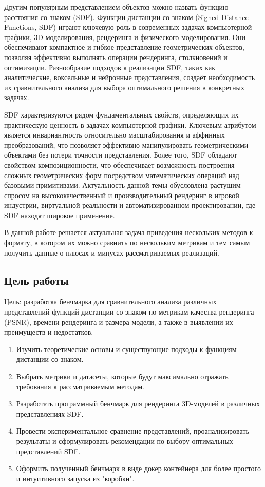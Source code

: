 \documentclass[a4paper,hidelinks,12pt]{article}
\begin{document}
\par
Другим популярным представлением объектов можно назвать функцию расстояния со знаком (SDF). Функции дистанции со знаком 
(Signed Distance Functions, SDF) играют ключевую роль в современных задачах компьютерной графики, 3D-моделирования, рендеринга и 
физического моделирования. Они обеспечивают компактное и гибкое представление геометрических объектов, позволяя эффективно выполнять 
операции рендеринга, столкновений и оптимизации. Разнообразие подходов к реализации SDF, таких как аналитические, воксельные и 
нейронные представления, создаёт необходимость их сравнительного анализа для выбора оптимального решения в конкретных задачах. 
\par
SDF характеризуются рядом фундаментальных свойств, определяющих их практическую ценность в задачах компьютерной графики. 
Ключевым атрибутом является инвариантность относительно масштабирования и аффинных преобразований, что позволяет эффективно 
манипулировать геометрическими объектами без потери точности представления. Более того, SDF обладают свойством композиционности, 
что обеспечивает возможность построения сложных геометрических форм посредством математических операций над базовыми примитивами. Актуальность данной темы обусловлена растущим спросом на высококачественный и производительный рендеринг в игровой индустрии, 
виртуальной реальности и автоматизированном проектировании, где SDF находят широкое применение. 
\par 
В данной работе решается актуальная задача приведения нескольких методов к формату, в котором их можно сравнить по нескольким метрикам и тем самым получить
данные о плюсах и минусах рассматриваемых реализаций.

\newpage
\subsection{Цель работы}
Цель: разработка бенчмарка для сравнительного анализа различных представлений функций дистанции со 
знаком по метрикам качества рендеринга (PSNR), времени рендеринга и размера модели, а также в выявлении их преимуществ и недостатков.

\begin{enumerate}
	\item Изучить теоретические основы и существующие подходы к функциям дистанции со знаком. 
	\item Выбрать метрики и датасеты, которые будут максимально отражать требования к рассматриваемым методам.
	\item Разработать программный бенчмарк для рендеринга 3D-моделей в различных представлениях SDF. 
	\item Провести экспериментальное сравнение представлений, проанализировать результаты и сформулировать рекомендации по выбору оптимальных представлений SDF.
	\item Оформить полученный бенчмарк в виде докер контейнера для более простого и интуитивного запуска из "коробки".
\end{enumerate}
\end{document}
